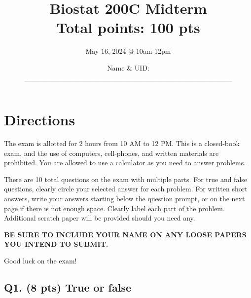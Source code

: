 \documentclass[
]{article}
\title{Biostat 200C Midterm\\
Total points: 100 pts}
\subtitle{May 16, 2024 @ 10am-12pm}
\author{Name \& UID:
\_\_\_\_\_\_\_\_\_\_\_\_\_\_\_\_\_\_\_\_\_\_\_\_\_\_\_\_\_\_\_\_\_\_\_\_\_\_\_\_}
\date{}
\begin{document}
\maketitle

{
\setcounter{tocdepth}{4}
\tableofcontents
}
\section{Directions}\label{directions}

The exam is allotted for 2 hours from 10 AM to 12 PM. This is a
closed-book exam, and the use of computers, cell-phones, and written
materials are prohibited. You are allowed to use a calculator as you
need to answer problems.

There are 10 total questions on the exam with multiple parts. For true
and false questions, clearly circle your selected answer for each
problem. For written short answers, write your answers starting below
the question prompt, or on the next page if there is not enough space.
Clearly label each part of the problem. Additional scratch paper will be
provided should you need any.

\textbf{BE SURE TO INCLUDE YOUR NAME ON ANY LOOSE PAPERS YOU INTEND TO
SUBMIT.}

Good luck on the exam!

\newpage

\subsection{Q1. (8 pts) True or false}\label{q1.-8-pts-true-or-false}
\end{document}
